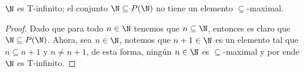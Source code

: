 
\begin{exercise}[1.11]
  $\N$ es T-infinito; el conjunto $\N \subseteq P(\N)$ no tiene un elemento $\subseteq$-maximal.
\end{exercise}
\begin{proof}
  Dado que para todo $n \in \N$ tenemos que $n \subseteq \N$, entonces es claro que $\N \subseteq P(\N)$. Ahora, sea $n \in \N$, notemos que $n+1 \in \N$ es un elemento tal que $n \subseteq n+1$ y $n \neq n+1$, de esta forma, ningún $n \in \N$ es $\subseteq$-maximal y por ende $\N$ es T-infinito.
\end{proof}
